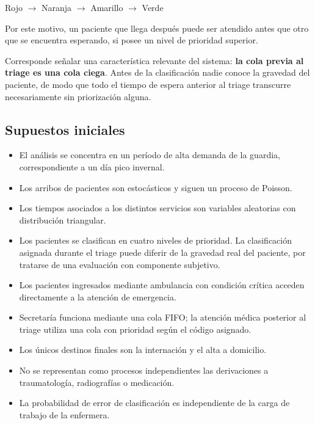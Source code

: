 \documentclass{article}
\begin{document}
\begin{center}
Rojo $\rightarrow$ Naranja $\rightarrow$ Amarillo $\rightarrow$ Verde
\end{center}

Por este motivo, un paciente que llega después puede ser atendido antes que
otro que se encuentra esperando, si posee un nivel de prioridad superior.

Corresponde señalar una característica relevante del sistema: \textbf{la cola
previa al triage es una cola ciega}. Antes de la clasificación nadie conoce la
gravedad del paciente, de modo que todo el tiempo de espera anterior al
triage transcurre necesariamente sin priorización alguna.

\subsection{Supuestos iniciales}

\begin{itemize}
  \item El análisis se concentra en un período de alta demanda de la guardia,
  correspondiente a un día pico invernal.
  \item Los arribos de pacientes son estocásticos y siguen un proceso de
  Poisson.
  \item Los tiempos asociados a los distintos servicios son variables
  aleatorias con distribución triangular.
  \item Los pacientes se clasifican en cuatro niveles de prioridad. La
  clasificación asignada durante el triage puede diferir de la gravedad real
  del paciente, por tratarse de una evaluación con componente subjetivo.
  \item Los pacientes ingresados mediante ambulancia con condición crítica
  acceden directamente a la atención de emergencia.
  \item Secretaría funciona mediante una cola FIFO; la atención médica
  posterior al triage utiliza una cola con prioridad según el código asignado.
  \item Los únicos destinos finales son la internación y el alta a domicilio.
  \item No se representan como procesos independientes las derivaciones a
  traumatología, radiografías o medicación.
  \item La probabilidad de error de clasificación es independiente de la carga
  de trabajo de la enfermera.
\end{itemize}
\end{document}
